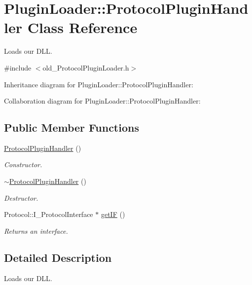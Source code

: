 \hypertarget{classPluginLoader_1_1ProtocolPluginHandler}{}\section{Plugin\+Loader\+::Protocol\+Plugin\+Handler Class Reference}
\label{classPluginLoader_1_1ProtocolPluginHandler}


Loads our D\+LL.  




{\ttfamily \#include $<$old\+\_\+\+Protocol\+Plugin\+Loader.\+h$>$}



Inheritance diagram for Plugin\+Loader\+::Protocol\+Plugin\+Handler\+:


Collaboration diagram for Plugin\+Loader\+::Protocol\+Plugin\+Handler\+:
\subsection*{Public Member Functions}
\begin{DoxyCompactItemize}
\item 
\mbox{\hyperlink{classPluginLoader_1_1ProtocolPluginHandler_a05cf352c880a167e5754e76e14b3db8c}{Protocol\+Plugin\+Handler}} ()
\begin{DoxyCompactList}\small\item\em Constructor. \end{DoxyCompactList}\item 
\mbox{\hyperlink{classPluginLoader_1_1ProtocolPluginHandler_a550c8ff8bb4fe793abe02d4be72f9b5d}{$\sim$\+Protocol\+Plugin\+Handler}} ()
\begin{DoxyCompactList}\small\item\em Destructor. \end{DoxyCompactList}\item 
Protocol\+::\+I\+\_\+\+Protocol\+Interface $\ast$ \mbox{\hyperlink{classPluginLoader_1_1ProtocolPluginHandler_a446375f1d651a8eb6c708c05a03dc9db}{get\+IF}} ()
\begin{DoxyCompactList}\small\item\em Returns an interface. \end{DoxyCompactList}\end{DoxyCompactItemize}


\subsection{Detailed Description}
Loads our D\+LL. 

